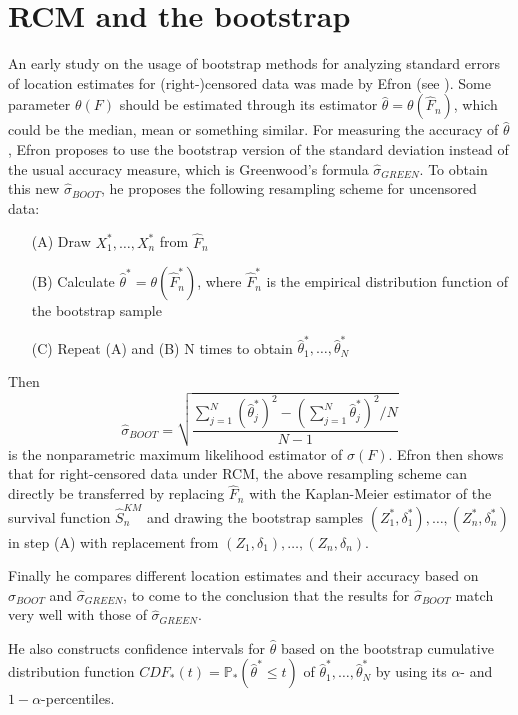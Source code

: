 \section{RCM and the bootstrap}

An early study on the usage of bootstrap methods for analyzing standard errors of location estimates for (right-)censored data was made by Efron (see \cite{PAPER1}). 
Some parameter $\theta(F)$ should be estimated through its estimator $\hat{\theta} = \theta(\hat{F}_n)$, which could be the median, mean or something similar. 
For measuring the accuracy of $\hat{\theta}$, Efron proposes to use the bootstrap version of the standard deviation instead of the usual accuracy measure, which is Greenwood's formula $\hat{\sigma}_{GREEN}$. To obtain this new $\hat{\sigma}_{BOOT}$, he proposes the following resampling scheme for uncensored data:
\begin{resampling_scheme}\label{cb_rs}
\begin{enumerate}
\item[(A)] Draw $X_1^*,\ldots,X_n^*$ from $\hat{F}_n$
\item[(B)] Calculate $\hat{\theta}^* = \theta(\hat{F}_n^*)$, where $\hat{F}_n^*$ is the empirical distribution function of the bootstrap sample
\item[(C)] Repeat (A) and (B) N times to obtain $\hat{\theta}_1^*,\ldots,\hat{\theta}_N^*$
\end{enumerate}
\end{resampling_scheme}
Then 
\[
\hat{\sigma}_{BOOT} = \sqrt{\frac{\sum_{j=1}^{N}\left(\hat{\theta}_j^*\right)^2 - \left(\sum_{j=1}^{N}\hat{\theta}_j^*\right)^2/N}{N-1}}
\]
is the nonparametric maximum likelihood estimator of $\sigma(F)$.
Efron then shows that for right-censored data under RCM, the above resampling scheme can directly be transferred by replacing $\hat{F}_n$ with the Kaplan-Meier estimator of the survival function $\hat{S}_n^{KM}$ and drawing the bootstrap samples $(Z_1^*,\delta_1^*),\ldots,(Z_n^*,\delta_n^*)$ in step (A) with replacement from $(Z_1,\delta_1),\ldots,(Z_n,\delta_n)$.

Finally he compares different location estimates and their accuracy based on $\hat{\sigma}_{BOOT}$ and $\hat{\sigma}_{GREEN}$, to come to the conclusion that the results for $\hat{\sigma}_{BOOT}$ match very well with those of $\hat{\sigma}_{GREEN}$.

He also constructs confidence intervals for $\hat{\theta}$ based on the bootstrap cumulative distribution function $CDF_*(t) = \mathbb{P}_*(\hat{\theta}^*\leq t)$ of $\hat{\theta}_1^*,\ldots,\hat{\theta}_N^*$ by using its $\alpha$- and $1-\alpha$-percentiles.


